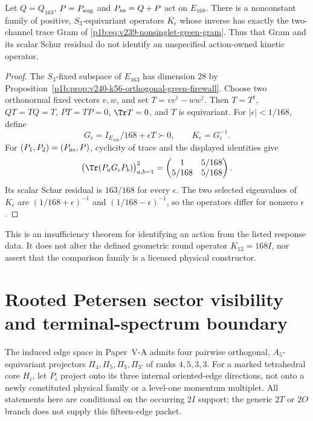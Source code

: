 \documentclass[12pt,a4paper]{article}
\begin{document}
\begin{proposition}
\label{p6:prop:v246-neutral-green-trace-nonuniqueness}
Let $Q=Q_{163}$, $P=P_{\rm aug}$ and $P_{\rm ns}=Q+P$ act on
$E_{168}$. There is a nonconstant family of positive, $S_3$-equivariant
operators $K_\epsilon$ whose inverse has exactly the two-channel trace
Gram of \eqref{p1b:eq:v239-nonsinglet-green-gram}.
Thus that Gram and its scalar Schur residual do not identify an
unspecified action-owned kinetic operator.
\end{proposition}
\begin{proof}
The $S_3$-fixed subspace of $E_{163}$ has dimension $28$ by
Proposition~\ref{p1b:prop:v240-k56-orthogonal-green-firewall}.
Choose two orthonormal fixed vectors $v,w$, and set
$T=vv^\dagger-ww^\dagger$. Then $T=T^\dagger$, $QT=TQ=T$,
$PT=TP=0$, $\Tr T=0$, and $T$ is equivariant. For
$|\epsilon|<1/168$, define
\[
 G_\epsilon=I_{E_{168}}/168+\epsilon T\succ0,
 \qquad K_\epsilon=G_\epsilon^{-1}.
\]
For $(P_1,P_2)=(P_{\rm ns},P)$, cyclicity of trace and the displayed
identities give
\[
 \bigl(\Tr(P_aG_\epsilon P_b)\bigr)_{a,b=1}^2
 =\begin{pmatrix}1&5/168\\5/168&5/168\end{pmatrix}.
\]
Its scalar Schur residual is $163/168$ for every $\epsilon$.
The two selected eigenvalues of $K_\epsilon$ are
$(1/168+\epsilon)^{-1}$ and $(1/168-\epsilon)^{-1}$,
so the operators differ for nonzero $\epsilon$.
\end{proof}
This is an insufficiency theorem for identifying an action from the
listed response data. It does not alter the defined geometric round
operator $K_{12}=168I$, nor assert that the comparison family is a
licensed physical constructor.



\section{Rooted Petersen sector visibility and terminal-spectrum boundary}
\label{p6:sec:v321-petersen-sector-visibility}

The induced edge space in Paper~V-A admits four pairwise orthogonal,
$A_5$-equivariant projectors $\Pi_4,\Pi_5,\Pi_3,\Pi_{3'}$ of ranks
$4,5,3,3$. For a marked tetrahedral core $H_i$, let $P_i$ project onto its
three internal oriented-edge directions, not onto a newly constituted
physical family or a level-one momentum multiplet.
All statements here are conditional on the occurring $2I$ support; the
generic $2T$ or $2O$ branch does not supply this fifteen-edge packet.
\end{document}
